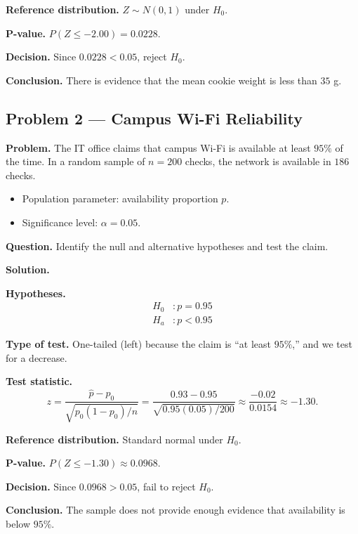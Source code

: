 	\textbf{Reference distribution.} $Z \sim N(0,1)$ under $H_0$.
	
	\textbf{P-value.} $P(Z\le -2.00)=0.0228$.
	
	\textbf{Decision.} Since $0.0228<0.05$, reject $H_0$.
	
	\textbf{Conclusion.} There is evidence that the mean cookie weight is less than $35$ g.
	
	\hypertarget{c2-ex2}{}
	\subsection*{Problem 2 — Campus Wi-Fi Reliability}
	
	\textbf{Problem.} The IT office claims that campus Wi-Fi is available at least $95\%$ of the time. In a random sample of $n=200$ checks, the network is available in $186$ checks.
	\begin{itemize}
		\item Population parameter: availability proportion $p$.
		\item Significance level: $\alpha=0.05$.
	\end{itemize}
	
	\textbf{Question.} Identify the null and alternative hypotheses and test the claim.
	
	\textbf{Solution.}
	
	\textbf{Hypotheses.}
	\[
	\begin{aligned}
		H_0&: p = 0.95 \\
		H_a&: p < 0.95
	\end{aligned}
	\]
	
	\textbf{Type of test.} One-tailed (left) because the claim is “at least $95\%$,” and we test for a decrease.
	
	\textbf{Test statistic.}
	\[
	z = \frac{\hat{p}-p_0}{\sqrt{p_0(1-p_0)/n}} = \frac{0.93-0.95}{\sqrt{0.95(0.05)/200}} \approx \frac{-0.02}{0.0154} \approx -1.30.
	\]
	
	\textbf{Reference distribution.} Standard normal under $H_0$.
	
	\textbf{P-value.} $P(Z\le -1.30)\approx 0.0968$.
	
	\textbf{Decision.} Since $0.0968>0.05$, fail to reject $H_0$.
	
	\textbf{Conclusion.} The sample does not provide enough evidence that availability is below $95\%$.
	
	
